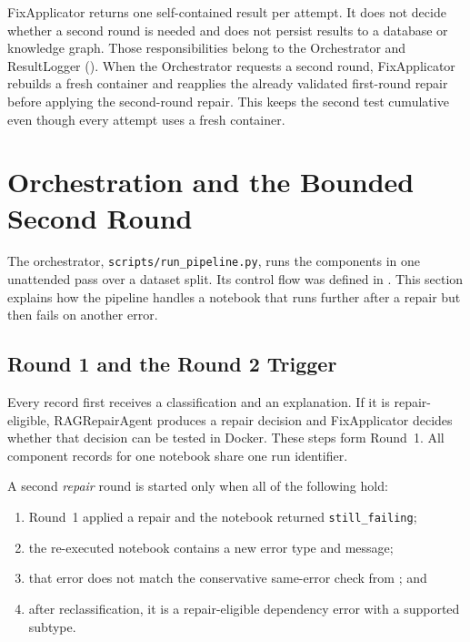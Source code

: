 FixApplicator returns one self-contained result per attempt. It does not decide
whether a second round is needed and does not persist results to a database or
knowledge graph. Those responsibilities belong to the Orchestrator and
ResultLogger (). When the Orchestrator requests a
second round, FixApplicator rebuilds a fresh container and reapplies the already
validated first-round repair before applying the second-round repair. This keeps
the second test cumulative even though every attempt uses a fresh container.

\section{Orchestration and the Bounded Second Round}
\label{sec:m-orchestrator-round2}

The orchestrator, \texttt{scripts/run\_pipeline.py}, runs the components in
one unattended pass over a dataset split. Its control flow was defined in
. This section explains how the pipeline handles a
notebook that runs further after a repair but then fails on another error.

\subsection{Round 1 and the Round 2 Trigger}

Every record first receives a classification and an explanation. If it is
repair-eligible, RAGRepairAgent produces a repair decision and FixApplicator
decides whether that decision can be tested in Docker. These steps form
Round~1. All component records for one notebook share one run identifier.

A second \emph{repair} round is started only when all of the following hold:

\begin{enumerate}
  \item Round~1 applied a repair and the notebook returned
        \texttt{still\_failing};
  \item the re-executed notebook contains a new error type and message;
  \item that error does not match the conservative same-error check from
        ; and
  \item after reclassification, it is a repair-eligible dependency error with
        a supported subtype.
\end{enumerate}

